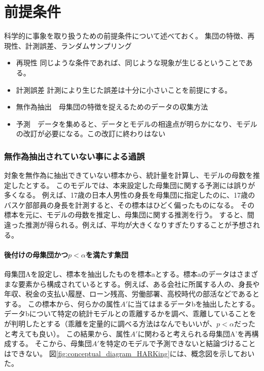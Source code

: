 \chapter{前提条件}
科学的に事象を取り扱うための前提条件について述べておく。
集団の特徴、再現性、計測誤差、ランダムサンプリング

\begin{itemize}
    \item 再現性 同じような条件であれば、同じような現象が生じるということである。
    \item 計測誤差  計測により生じた誤差は十分に小さいことを前提にする。
    \item 無作為抽出　母集団の特徴を捉えるためのデータの収集方法
    \item 予測　データを集めると、データとモデルの相違点が明らかになり、モデルの改訂が必要になる。この改訂に終わりはない
\end{itemize}



\subsection{無作為抽出されていない事による過誤}
対象を無作為に抽出できていない標本から、統計量を計算し、モデルの母数を推定したとする。
このモデルでは、本来設定した母集団に関する予測には誤りが多くなる。
例えば、17歳の日本人男性の身長を母集団に指定したのに、17歳のバスケ部部員の身長を計測すると、その標本はひどく偏ったものになる。
その標本を元に、モデルの母数を推定し、母集団に関する推測を行う。
すると、間違った推測が得られる。例えば、平均が大きくなりすぎたりすることが予想される。

\subsubsection{後付けの母集団かつ$p<\alpha$を満たす集団}
母集団Aを設定し、標本を抽出したものを標本aとする。標本aのデータはさまざまな要素から構成されているとする。例えば、ある会社に所属する人の、身長や年収、税金の支払い履歴、ローン残高、労働部署、高校時代の部活などであるとする。
この標本から、何らかの属性$A'$に当てはまるデータbを抽出したとする。
データbについて特定の統計モデルとの乖離するかを調べ、乖離していることをが判明したとする（乖離を定量的に調べる方法はなんでもいいが、$p<\alpha$だったと考えても良い）。
この結果から、属性$A'$に関わると考えられる母集団A'を再構成する。
そこから、母集団$A'$を特定のモデルで予測できないと結論づけることはできない。
図\ref{fig:conceptual_diagram_HARKing}には、概念図を示しておいた。

